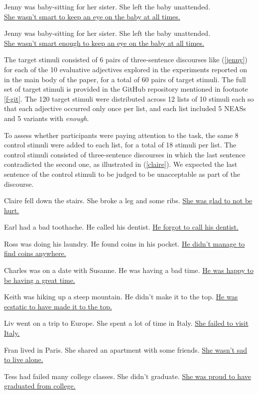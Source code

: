 \documentclass[11pt,fleqn]{article}
\newcommand{\6}{\mbox{$[\hspace*{-.6mm}[$}}
\newcommand{\9}{\mbox{$]\hspace*{-.6mm}]$}}
\begin{document}
\begin{exe} 
\ex\label{jenny} 
\begin{xlist}
\ex Jenny was baby-sitting for her sister. She
left the baby unattended. \\ \underline{She wasn't smart to keep an eye on the baby at all times.} 

\ex Jenny was baby-sitting for her sister. She
left the baby unattended. \\ \underline{She wasn't smart enough to keep an eye on the baby at all times.} 

\end{xlist}
\end{exe} 

The target stimuli consisted of 6 pairs of three-sentence discourses like (\ref{jenny}) for each of the 10 evaluative adjectives explored in the experiments reported on in the main body of the paper, for a total of 60 pairs of target stimuli. The full set of target stimuli is provided in the GitHub repository mentioned in footnote \ref{f-git}. The 120 target stimuli were distributed across 12 lists of 10 stimuli each so that each adjective occurred only once per list, and each list included 5 NEASs and 5 variants with {\em enough}. 

To assess whether participants were paying attention to the task, the same 8 control stimuli were added to each list, for a total of 18 stimuli per list. The control stimuli consisted of three-sentence discourses in
which the last sentence contradicted the second one, as illustrated in
(\ref{claire}). We expected the last sentence of the control stimuli to be judged to be unacceptable as part of the discourse.

\begin{exe} 
\ex\label{claire} 
\begin{xlist}
\ex Claire fell down the stairs. She broke a leg and some ribs. \uline{She was glad to not be hurt.} 

\ex Earl had a bad toothache. He called his dentist. \uline{He forgot to call his dentist.}

\ex Ross was doing his laundry. He found coins in his pocket. \uline{He didn't manage to find coins anywhere.}

\ex Charles was on a date with Susanne. He was having a bad time. \uline{He was happy to be having a great time.}

\ex Keith was hiking up a steep mountain. He didn't make it to the top. \uline{He was ecstatic to have made it to the top.}

\ex Liv went on a trip to Europe. She spent a lot of time in Italy. \uline{She failed to visit Italy.}

\ex Fran lived in Paris. She shared an apartment with some friends. \uline{She wasn't sad to live alone.}

\ex Tess had failed many college classes. She didn't graduate. \uline{She was proud to have graduated from college.}

\end{xlist}
\end{exe}
\end{document}
